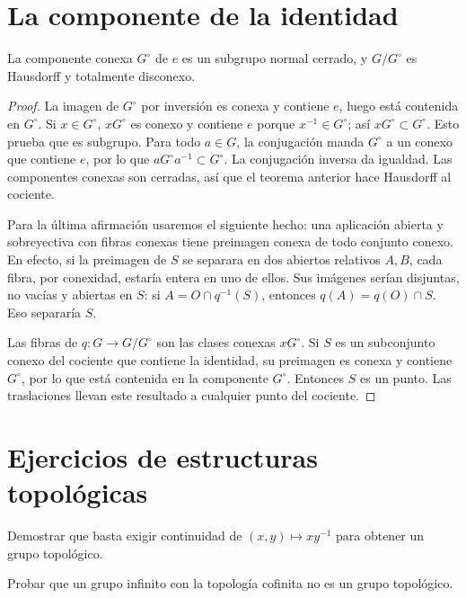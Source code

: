 \section{La componente de la identidad}
\begin{teorema}
La componente conexa $G^\circ$ de $e$ es un subgrupo normal cerrado, y $G/G^\circ$ es Hausdorff y totalmente disconexo.
\end{teorema}
\begin{proof}
La imagen de $G^\circ$ por inversión es conexa y contiene $e$, luego está contenida en $G^\circ$. Si $x\in G^\circ$, $xG^\circ$ es conexo y contiene $e$ porque $x^{-1}\in G^\circ$; así $xG^\circ\subset G^\circ$. Esto prueba que es subgrupo. Para todo $a\in G$, la conjugación manda $G^\circ$ a un conexo que contiene $e$, por lo que $aG^\circ a^{-1}\subset G^\circ$. La conjugación inversa da igualdad. Las componentes conexas son cerradas, así que el teorema anterior hace Hausdorff al cociente.

Para la última afirmación usaremos el siguiente hecho: una aplicación abierta y sobreyectiva con fibras conexas tiene preimagen conexa de todo conjunto conexo. En efecto, si la preimagen de $S$ se separara en dos abiertos relativos $A,B$, cada fibra, por conexidad, estaría entera en uno de ellos. Sus imágenes serían disjuntas, no vacías y abiertas en $S$: si $A=O\cap q^{-1}(S)$, entonces $q(A)=q(O)\cap S$. Eso separaría $S$.

Las fibras de $q:G\to G/G^\circ$ son las clases conexas $xG^\circ$. Si $S$ es un subconjunto conexo del cociente que contiene la identidad, su preimagen es conexa y contiene $G^\circ$, por lo que está contenida en la componente $G^\circ$. Entonces $S$ es un punto. Las traslaciones llevan este resultado a cualquier punto del cociente.
\end{proof}

\section{Ejercicios de estructuras topológicas}
\begin{ejercicio}\label{ej:v4-l15-1}
Demostrar que basta exigir continuidad de $(x,y)\mapsto xy^{-1}$ para obtener un grupo topológico.
\end{ejercicio}

\begin{ejercicio}\label{ej:v4-l15-2}
Probar que un grupo infinito con la topología cofinita no es un grupo topológico.
\end{ejercicio}

